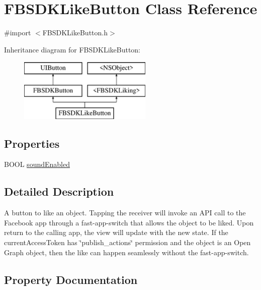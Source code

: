 \hypertarget{interface_f_b_s_d_k_like_button}{}\section{F\+B\+S\+D\+K\+Like\+Button Class Reference}
\label{interface_f_b_s_d_k_like_button}


{\ttfamily \#import $<$F\+B\+S\+D\+K\+Like\+Button.\+h$>$}

Inheritance diagram for F\+B\+S\+D\+K\+Like\+Button\+:\begin{figure}[H]
\begin{center}
\leavevmode
\includegraphics[height=3.000000cm]{interface_f_b_s_d_k_like_button}
\end{center}
\end{figure}
\subsection*{Properties}
\begin{DoxyCompactItemize}
\item 
B\+O\+O\+L \hyperlink{interface_f_b_s_d_k_like_button_ab7c25ce02e165da8ebd690c2348594ee}{sound\+Enabled}
\end{DoxyCompactItemize}


\subsection{Detailed Description}
A button to like an object.  Tapping the receiver will invoke an A\+P\+I call to the Facebook app through a fast-\/app-\/switch that allows the object to be liked. Upon return to the calling app, the view will update with the new state. If the current\+Access\+Token has \char`\"{}publish\+\_\+actions\char`\"{} permission and the object is an Open Graph object, then the like can happen seamlessly without the fast-\/app-\/switch. 

\subsection{Property Documentation}
\hypertarget{interface_f_b_s_d_k_like_button_ab7c25ce02e165da8ebd690c2348594ee}{}
